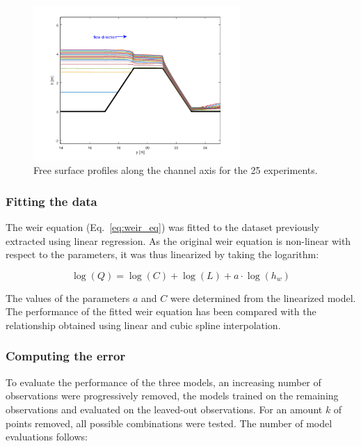 \begin{figure}[h]
  \centering
  \includegraphics[width=0.7\textwidth]{Figures/free_surfaces.png}
  \caption{Free surface profiles along the channel axis for the \num{25} experiments.}
  \label{fig:free_surfaces}
\end{figure}


\subsubsection{Fitting the data}
The weir equation (Eq.~\ref{eq:weir_eq}) was fitted to the dataset previously extracted using linear regression.
As the original weir equation is non-linear with respect to the parameters, it was thus linearized by taking the logarithm:

\begin{equation}
  \log(Q) = \log(C) + \log(L) + a \cdot \log(h_w)
\end{equation}

\noindent The values of the parameters $a$ and $C$ were determined from the linearized model.
The performance of the fitted weir equation has been compared with the relationship obtained using linear and cubic spline interpolation.

\subsubsection{Computing the error}\label{sec:compute_error}
To evaluate the performance of the three models, an increasing number of observations were progressively removed, the models trained on the remaining observations and evaluated on the leaved-out observations.
For an amount $k$ of points removed, all possible combinations were tested. The number of model evaluations follows:


